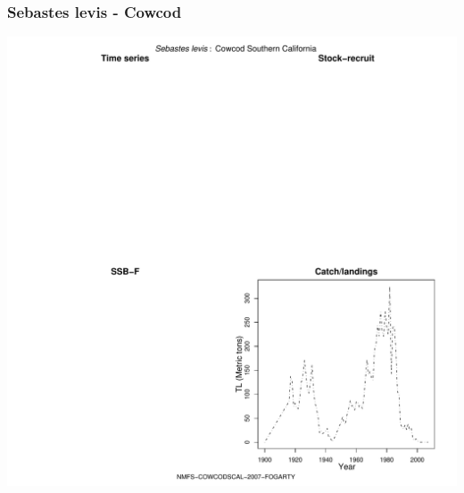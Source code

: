 \subsubsection{Sebastes levis - Cowcod}
\begin{center}
\includegraphics[width=1.2\textwidth]{../R/figures/NMFS-COWCODSCAL-2007-FOGARTY.pdf}
\end{center}

